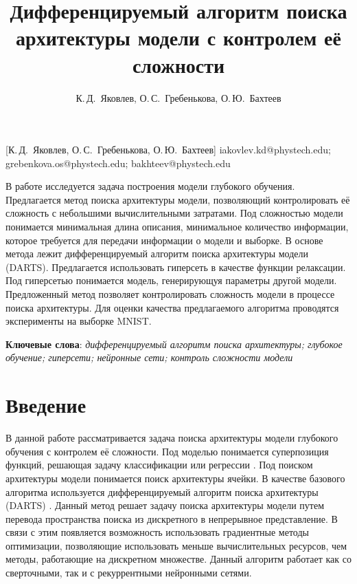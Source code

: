 \documentclass[12pt, twoside]{article}
\begin{document}
\title
    [Дифференцируемый алгоритм поиска архитектуры модели с контролем её сложности] %
    {Дифференцируемый алгоритм поиска архитектуры модели с контролем её сложности}
\author
    [К.\,Д.~Яковлев, О.\,С.~Гребенькова, О.\,Ю.~Бахтеев] %
    {К.\,Д.~Яковлев, О.\,С.~Гребенькова, О.\,Ю.~Бахтеев} %
    [К.\,Д.~Яковлев, О.\,С.~Гребенькова, О.\,Ю.~Бахтеев] %
\email
    { iakovlev.kd@phystech.edu; grebenkova.os@phystech.edu; bakhteev@phystech.edu}

\abstract
    {В работе исследуется задача построения модели глубокого обучения. Предлагается метод поиска архитектуры модели, позволяющий контролировать её сложность с небольшими вычислительными затратами. Под сложностью модели понимается минимальная длина описания,
минимальное количество информации, которое требуется для передачи информации о модели и выборке. В основе метода лежит дифференцируемый алгоритм поиска архитектуры модели (DARTS). Предлагается использовать гиперсеть в качестве функции релаксации.  Под гиперсетью понимается модель, генерирующуя параметры другой модели. Предложенный метод позволяет контролировать сложность модели в процессе поиска архитектуры. Для оценки качества предлагаемого алгоритма проводятся эксперименты на выборке MNIST.
	
\bigskip
\noindent
\textbf{Ключевые слова}: \emph {дифференцируемый алгоритм поиска архитектуры; глубокое обучение; гиперсети; нейронные сети; контроль сложности модели}
}





\maketitle
\linenumbers

\section{Введение}


В данной работе рассматривается задача поиска архитектуры модели глубокого обучения с контролем её сложности. Под моделью понимается суперпозиция функций, решающая задачу классификации или регрессии \cite{journals/aarc/BakhteevS18}. Под поиском архитектуры модели понимается поиск архитектуры ячейки. В качестве базового алгоритма используется дифференцируемый алгоритм поиска архитектуры (DARTS) \cite{journals/corr/abs-1806-09055}. Данный метод решает задачу поиска архитектуры модели путем перевода пространства поиска из дискретного в непрерывное представление. В связи с этим появляется возможность использовать градиентные методы оптимизации, позволяющие использовать меньше вычислительных ресурсов, чем методы, работающие на дискретном множестве. Данный алгоритм работает как со сверточными, так и с рекуррентными нейронными сетями.
\end{document}
